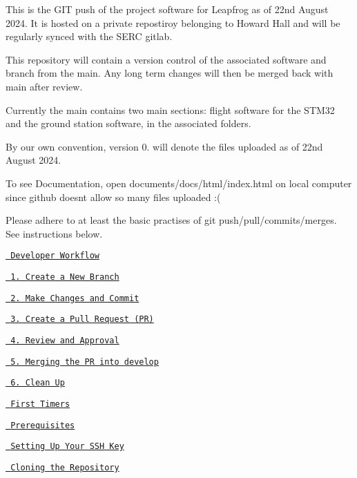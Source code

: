 This is the G\+IT push of the project software for Leapfrog as of 22nd August 2024. It is hosted on a private repostiroy belonging to Howard Hall and will be regularly synced with the S\+E\+RC gitlab.

This repository will contain a version control of the associated software and branch from the main. Any long term changes will then be merged back with main after review.

Currently the main contains two main sections\+: flight software for the S\+T\+M32 and the ground station software, in the associated folders.

By our own convention, version 0. will denote the files uploaded as of 22nd August 2024.

To see Documentation, open documents/docs/html/index.\+html on local computer since github doesn\textquotesingle{}t allow so many files uploaded {\ttfamily \+:(}

Please adhere to at least the basic practises of git push/pull/commits/merges. See instructions below.


\begin{DoxyItemize}
\item \href{\#developer-workflow}{\texttt{ Developer Workflow}}
\begin{DoxyItemize}
\item \href{\#create-a-new-branch}{\texttt{ 1. Create a New Branch}}
\item \href{\#make-changes-and-commit}{\texttt{ 2. Make Changes and Commit}}
\item \href{\#create-a-pull-request-pr}{\texttt{ 3. Create a Pull Request (PR)}}
\item \href{\#review-and-approval}{\texttt{ 4. Review and Approval}}
\item \href{\#merging-the-pr-into-develop}{\texttt{ 5. Merging the PR into {\ttfamily develop}}}
\item \href{\#clean-up}{\texttt{ 6. Clean Up}}
\end{DoxyItemize}
\item \href{\#how-to-git}{\texttt{ First Timers}}
\begin{DoxyItemize}
\item \href{\#prerequisites}{\texttt{ Prerequisites}}
\item \href{\#setting-up-your-ssh-key}{\texttt{ Setting Up Your S\+SH Key}}
\item \href{\#cloning-the-repository}{\texttt{ Cloning the Repository}}
\end{DoxyItemize}
\end{DoxyItemize}





